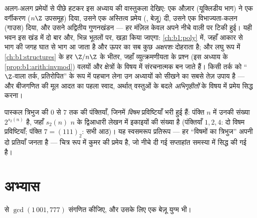 \begin{remark}[मध्यांतर: $\Z$ एक आदर्श के रूप में]\label{rem:b1:arith:interlude}
अलग-अलग प्रमेयों से पीछे हटकर इस अध्याय की वास्तुकला देखिए: एक औज़ार
(यूक्लिडीय भाग) ने एक वर्गीकरण ($n\Z$ उपसमूह) दिया, उसने एक अस्तित्व प्रमेय
(, बेज़ू) दी, उसने एक विभाज्यता-कलन (गाउस) दिया, और उसने
अद्वितीय गुणनखंडन --- हर मंज़िल केवल अपने नीचे वाली पर टिकी हुई। यही भवन इस
खंड में दो बार और, भिन्न भूतलों पर, खड़ा किया जाएगा: \cref{ch:b1:poly} में,
जहाँ आकार से भाग की जगह घात से भाग आ जाता है और ऊपर का सब कुछ \emph{अक्षरशः}
दोहराता है; और लघु रूप में \cref{ch:b1:structures} के हर $\Z/n\Z$ के भीतर,
जहाँ व्युत्क्रमणीयता के प्रश्न (इस अध्याय के \cref{prop:b1:arith:invmod})
वलयों और क्षेत्रों के विषय में संरचनात्मक  बन जाते हैं। किसी तर्क को
``$\Z$-वाला तर्क, प्रतिरोपित'' के रूप में पहचान लेना उन अध्यायों को सीखने का
सबसे तेज़ उपाय है --- और बीजगणित की मूल आदत का पहला स्वाद, अर्थात् वस्तुओं
के बदले \emph{अभिगृहीतों} के विषय में प्रमेय सिद्ध करना।
\end{remark}

\begin{omfigure}

{\small पास्कल त्रिभुज की $0$ से $7$ तक की पंक्तियाँ, जिनमें \emph{विषम}
प्रविष्टियाँ भरी हुई हैं: पंक्ति $n$ में उनकी संख्या $2^{s_2(n)}$ है, जहाँ
$s_2(n)$ $n$ के द्विआधारी लेखन में इकाइयों की संख्या है (पंक्तियाँ $1, 2,
4$: दो विषम प्रविष्टियाँ; पंक्ति $7 = (111)_2$: सभी आठ)। यह स्वसमरूप
प्रतिरूप --- हर ``विषमों का त्रिभुज'' अपनी दो प्रतियाँ जनता है --- चित्र रूप
में कुमर की प्रमेय है, जो नीचे दी गई सप्ताहांत समस्या में सिद्ध की गई है।}
\end{omfigure}

\section{अभ्यास}

\begin{exercise}[$\star$]\label{exo:b1:arith:1}
 से $\gcd(1\,001, 777)$ संगणित कीजिए, और उसके लिए एक बेज़ू
युग्म भी।
\end{exercise}

